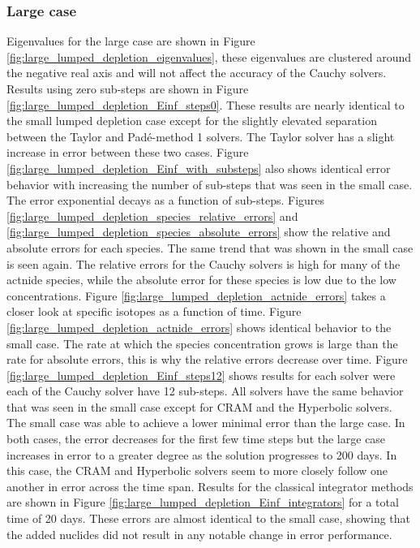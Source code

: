 \subsubsection{Large case}
Eigenvalues for the large case are shown in Figure \ref{fig:large_lumped_depletion_eigenvalues}, these eigenvalues are clustered around the negative real axis and will not affect the accuracy of the Cauchy solvers. Results using zero sub-steps are shown in Figure \ref{fig:large_lumped_depletion_Einf_steps0}. These results are nearly identical to the small lumped depletion case except for the slightly elevated separation between the Taylor and Pad\'e-method 1 solvers. The Taylor solver has a slight increase in error between these two cases. Figure \ref{fig:large_lumped_depletion_Einf_with_substeps} also shows identical error behavior with increasing the number of sub-steps that was seen in the small case. The error exponential decays as a function of sub-steps. Figures \ref{fig:large_lumped_depletion_species_relative_errors} and \ref{fig:large_lumped_depletion_species_absolute_errors} show the relative and absolute errors for each species. The same trend that was shown in the small case is seen again. The relative errors for the Cauchy solvers is high for many of the actnide species, while the absolute error for these species is low due to the low concentrations. Figure \ref{fig:large_lumped_depletion_actnide_errors} takes a closer look at specific isotopes as a function of time. Figure \ref{fig:large_lumped_depletion_actnide_errors} shows identical behavior to the small case. The rate at which the species concentration grows is large than the rate for absolute errors, this is why the relative errors decrease over time. Figure \ref{fig:large_lumped_depletion_Einf_steps12} shows results for each solver were each of the Cauchy solver have 12 sub-steps. All solvers have the same behavior that was seen in the small case except for CRAM and the Hyperbolic solvers. The small case was able to achieve a lower minimal error than the large case. In both cases, the error decreases for the first few time steps but the large case increases in error to a greater degree as the solution progresses to 200 days. In this case, the CRAM and Hyperbolic solvers seem to more closely follow one another in error across the time span. Results for the classical integrator methods are shown in Figure \ref{fig:large_lumped_depletion_Einf_integrators} for a total time of 20 days. These errors are almost identical to the small case, showing that the added nuclides did not result in any notable change in error performance. 


